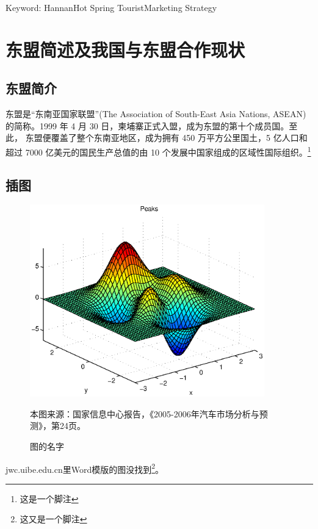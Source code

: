 \documentclass[12pt]{ctexart}
\begin{document}
\vspace{0.35cm}

Keyword: Hannan\quad Hot Spring Tourist\quad Marketing Strategy
\newpage
{}
\section{东盟简述及我国与东盟合作现状}
\subsection{东盟简介}
东盟是“东南亚国家联盟”(The Association of South-East Asia Nations, ASEAN)的简称。1999 年 4 月 30 日，柬埔寨正式入盟，成为东盟的第十个成员国。至此， 东盟便覆盖了整个东南亚地区，成为拥有 450 万平方公里国土，5 亿人口和超过 7000 亿美元的国民生产总值的由 10 个发展中国家组成的区域性国际组织。\footnote{这是一个脚注}
\subsection{插图}
\begin{figure}[H]
\begin{center}
\includegraphics[width=4in]{egpic.eps}
\caption{图的名字}
\end{center}
本图来源：国家信息中心报告，《2005-2006年汽车市场分析与预测》，第24页。
\end{figure}
jwc.uibe.edu.cn里Word模版的图没找到\footnote{这又是一个脚注}。
\end{document}
